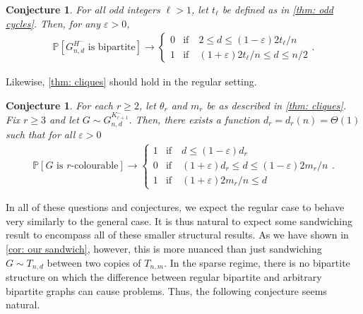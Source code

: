\documentclass[11pt]{article}
\newcommand{\eps}{\varepsilon}
\def\P{\mathbb P}
\theoremstyle{plain}
\newtheorem{conj}[thm]{Conjecture}
\begin{document}
\begin{conj}
     For all odd integers $\ell > 1$, let $t_\ell$ be defined as in \cref{thm: odd cycles}. Then, for any $\eps > 0$,
    \begin{align*}
        \P[G^{H^-}_{n,d} \text{ is bipartite}]\rightarrow \begin{cases}
            0 &\text{if}\quad 2 \leq d \leq (1 - \eps)2t_\ell/n\\
            1 &\text{if} \quad (1 + \eps)2t_\ell/n \leq d \leq n/2
        \end{cases}
        .
    \end{align*}
\end{conj}

Likewise, \cref{thm: cliques} should hold in the regular setting.

\begin{conj}
    For each $r \geq 2$, let $\theta_r$ and $m_r$ be as described in \cref{thm: cliques}.
    Fix $r \geq 3$ and let $G\sim G_{n,d}^{K_{r+1}^-}$. Then, there exists a function $d_r = d_r(n) = \Theta(1)$ such that for all $\eps > 0$
    \begin{align*}
        \P[G \text{ is $r$-colourable}] \rightarrow \begin{cases}
            1 &\text{if} \quad d \leq (1 - \eps)d_r\\
            0 &\text{if} \quad (1 + \eps)d_r \leq d \leq (1 - \eps)2m_r/n\\
            1 &\text{if}\quad (1 + \eps)2m_r/n \leq d
        \end{cases}
        .
    \end{align*}
\end{conj}



In all of these questions and conjectures, we expect the regular case to behave very similarly to the general case. It is thus natural to expect some sandwiching result to encompass all of these smaller structural results. As we have shown in \cref{cor: our sandwich}, however, this is more nuanced than just sandwiching $G \sim T_{n,d}$ between two copies of $T_{n,m}$. In the sparse regime, there is no bipartite structure on which the difference between regular bipartite and arbitrary bipartite graphs can cause problems. Thus, the following conjecture seems natural.
\end{document}
